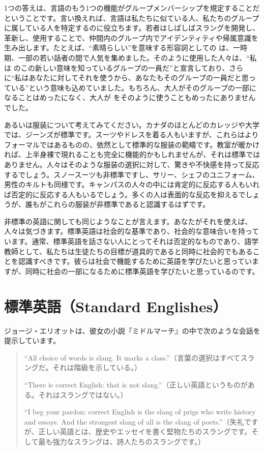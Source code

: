 1つの答えは、言語のもう1つの機能がグループメンバーシップを規定することだということです。言い換えれば、言語は私たちに似ている人、私たちのグループに属している人を特定するのに役立ちます。若者はしばしばスラングを開発し、革新し、使用することで、仲間内のグループ内でアイデンティティや帰属意識を生み出します。たとえば、\enquote{素晴らしい}を意味する形容詞としての  は、一時期、一部の若い話者の間で人気を集めました。そのように使用した人々は、\enquote{私は  のこの新しい意味を知っているグループの一員だ}と宣言しており、さらに\enquote{私はあなたに対してそれを使うから、あなたもそのグループの一員だと思っている}という意味も込めていました。もちろん、大人がそのグループの一部になることはめったになく、大人が  をそのように使うこともめったにありませんでした。

あるいは服装について考えてみてください。カナダのほとんどのカレッジや大学では、ジーンズが標準です。スーツやドレスを着る人もいますが、これらはよりフォーマルではあるものの、依然として標準的な服装の範疇です。教室が暖かければ、上半身裸で現れることも完全に機能的かもしれませんが、それは標準ではありません。人々はそのような服装の選択に対して、驚きや不快感を持って反応するでしょう。スノースーツも非標準ですし、サリー、シェフのユニフォーム、男性のキルトも同様です。キャンパスの人々の中には肯定的に反応する人もいれば否定的に反応する人もいるでしょう。多くの人は表面的な反応を抑えるでしょうが、誰もがこれらの服装が非標準であると認識するはずです。

非標準の英語に関しても同じようなことが言えます。あなたがそれを使えば、人々は気づきます。標準英語は社会的な基準であり、社会的な意味合いを持っています。通常、標準英語を話さない人にとってそれは否定的なものであり、語学教師として、私たちは生徒たちの目標が道具的であると同時に社会的でもあることを認識すべきです。彼らは社会で機能するために英語を学びたいと思っていますが、同時に社会の一部になるために標準英語を学びたいと思っているのです。


\section{標準英語（Standard Englishes）}\label{sec:standard}

ジョージ・エリオットは、彼女の小説『ミドルマーチ』の中で次のような会話を提示しています。

\begin{quote}
    \enquote{All choice of words is slang. It marks a class.}（言葉の選択はすべてスラングだ。それは階級を示している。）

    \enquote{There is correct English: that is not slang.}（正しい英語というものがある。それはスラングではない。）

    \enquote{I beg your pardon: correct English is the slang of prigs who write history and essays. And the strongest slang of all is the slang of poets.}（失礼ですが、正しい英語とは、歴史やエッセイを書く堅物たちのスラングです。そして最も強力なスラングは、詩人たちのスラングです。）
\end{quote}



